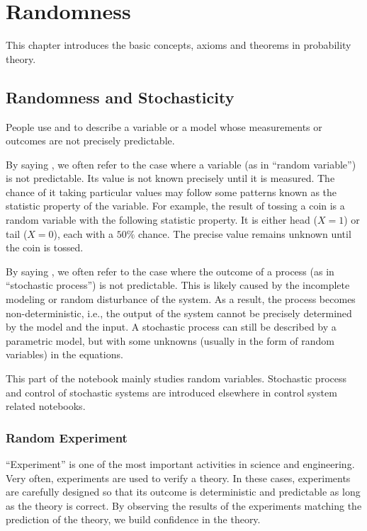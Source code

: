 \chapter{Randomness} \label{ch:pbbasics}

This chapter introduces the basic concepts, axioms and theorems in probability theory.

\section{Randomness and Stochasticity}

People use  and  to describe a variable or a model whose measurements or outcomes are not precisely predictable.

By saying , we often refer to the case where a variable (as in ``random variable'') is not predictable. Its value is not known precisely until it is measured. The chance of it taking particular values may follow some patterns known as the statistic property of the variable. For example, the result of tossing a coin is a random variable with the following statistic property. It is either head ($X=1$) or tail ($X=0$), each with a $50\%$ chance. The precise value remains unknown until the coin is tossed.

By saying , we often refer to the case where the outcome of a process (as in ``stochastic process'') is not predictable. This is likely caused by the incomplete modeling or random disturbance of the system. As a result, the process becomes non-deterministic, i.e., the output of the system cannot be precisely determined by the model and the input. A stochastic process can still be described by a parametric model, but with some unknowns (usually in the form of random variables) in the equations.

This part of the notebook mainly studies random variables. Stochastic process and control of stochastic systems are introduced elsewhere in control system related notebooks.

\subsection{Random Experiment}

``Experiment'' is one of the most important activities in science and engineering. Very often, experiments are used to verify a theory. In these cases, experiments are carefully designed so that its outcome is deterministic and predictable as long as the theory is correct. By observing the results of the experiments matching the prediction of the theory, we build confidence in the theory.

